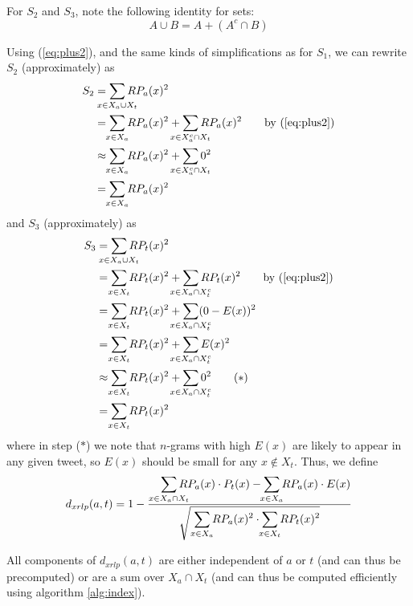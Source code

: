 \documentclass[twocolumn,10pt]{article}
\begin{document}
For $S_2$ and $S_3$, note the following identity for sets:
\begin{equation}
\label{eq:plus2}
A \cup B = A + (A^c \cap B)
\end{equation}

Using (\ref{eq:plus2}), and the same kinds of simplifications
as for $S_1$, we can rewrite $S_2$ (approximately) as
\begin{align*}
S_2
&=
    \smashoperator{\sum_{x \in X_a \cup X_t}} RP_a(x)^2
\\
&=
    \smashoperator{\sum_{x \in X_a}} RP_a(x)^2
    + \smashoperator{\sum_{x \in X_a^c \cap X_t}} RP_a(x)^2
\tag*{by (\ref{eq:plus2})}
\\
&\approx
    \smashoperator{\sum_{x \in X_a}} RP_a(x)^2
    + \smashoperator{\sum_{x \in X_a^c \cap X_t}} 0^2
\\
&= 
    \smashoperator{\sum_{x \in X_a}} RP_a(x)^2
\end{align*}
and $S_3$ (approximately) as 
\begin{align*}
S_3
&=
    \smashoperator{\sum_{x \in X_a \cup X_t}} RP_t(x)^2
\\
&=
    \smashoperator{\sum_{x \in X_t}} RP_t(x)^2
    + \smashoperator{\sum_{x \in X_a \cap X_t^c}} RP_t(x)^2
\tag*{by (\ref{eq:plus2})}
\\
&=
    \smashoperator{\sum_{x \in X_t}} RP_t(x)^2
    + \smashoperator{\sum_{x \in X_a \cap X_t^c}} (0 - E(x))^2
\\
&=
    \smashoperator{\sum_{x \in X_t}} RP_t(x)^2
    + \smashoperator{\sum_{x \in X_a \cap X_t^c}} E(x)^2
\\
&\approx
    \smashoperator{\sum_{x \in X_t}} RP_t(x)^2
    + \smashoperator{\sum_{x \in X_a \cap X_t^c}} 0^2
\tag{$*$}
\\
&=
    \smashoperator{\sum_{x \in X_t}} RP_t(x)^2
\end{align*}
where in step ($*$) we note that $n$-grams with high $E(x)$
are likely to appear in any given tweet, so $E(x)$ should be
small for any $x \notin X_t$.
Thus, we define
$$
d_{xrlp}(a, t)
= 1 -
\frac{\displaystyle
    \smashoperator[r]{\sum_{x \in X_a \cap X_t}}
        RP_a(x) \cdot P_t(x)
    - \smashoperator{\sum_{x \in X_a}}
        RP_a(x) \cdot E(x)
}{\displaystyle
    \sqrt{\smashoperator[r]{\sum_{x \in X_a}} RP_a(x)^2
    \cdot \smashoperator{\sum_{x \in X_t}} RP_t(x)^2}
}
$$

All components of $d_{xrlp}(a, t)$ are either independent of
$a$ or $t$ (and can thus be precomputed) or are a sum over
$X_a \cap X_t$ (and can thus be computed efficiently using
algorithm \ref{alg:index}).
\end{document}
